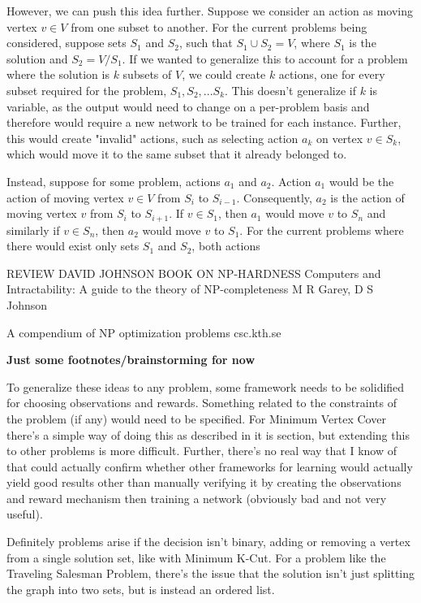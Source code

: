 \documentclass{article}
\begin{document}
However, we can push this idea further. Suppose we consider an action as moving vertex $v \in V$ from one subset to another. For the current problems being considered, suppose sets $S_1$ and $S_2$, such that $S_1 \cup S_2 = V$, where $S_1$ is the solution and $S_2 = V / S_1$. If we wanted to generalize this to account for a problem where the solution is $k$ subsets of $V$, we could create $k$ actions, one for every subset required for the problem, $S_1, S_2, ... S_k$. This doesn't generalize if $k$ is variable, as the output would need to change on a per-problem basis and therefore would require a new network to be trained for each instance. Further, this would create "invalid" actions, such as selecting action $a_k$ on vertex $v \in S_k$, which would move it to the same subset that it already belonged to. 

Instead, suppose for some problem, actions $a_1$ and $a_2$. Action $a_1$ would be the action of moving vertex $v \in V$ from $S_i$ to $S_{i-1}$. Consequently, $a_2$ is the action of moving vertex $v$ from $S_i$ to $S_{i+1}$. If $v \in S_1$, then $a_1$ would move $v$ to $S_n$ and similarly if $v \in S_n$, then $a_2$ would move $v$ to $S_1$. For the current problems where there would exist only sets $S_1$ and $S_2$, both actions 

REVIEW
DAVID JOHNSON BOOK ON NP-HARDNESS
Computers and Intractability: A guide to the theory of NP-completeness
M R Garey, D S Johnson 

A compendium of NP optimization problems 
csc.kth.se



\textbf{Just some footnotes/brainstorming for now}

To generalize these ideas to any problem, some framework needs to be solidified for choosing observations and rewards. Something related to the constraints of the problem (if any) would need to be specified. For Minimum Vertex Cover there's a simple way of doing this as described in it is section, but extending this to other problems is more difficult. Further, there's no real way that I know of that could actually confirm whether other frameworks for learning would actually yield good results other than manually verifying it by creating the observations and reward mechanism then training a network (obviously bad and not very useful).

Definitely problems arise if the decision isn't binary, adding or removing a vertex from a single solution set, like with Minimum K-Cut. For a problem like the Traveling Salesman Problem, there's the issue that the solution isn't just splitting the graph into two sets, but is instead an ordered list. 



\end{document}
